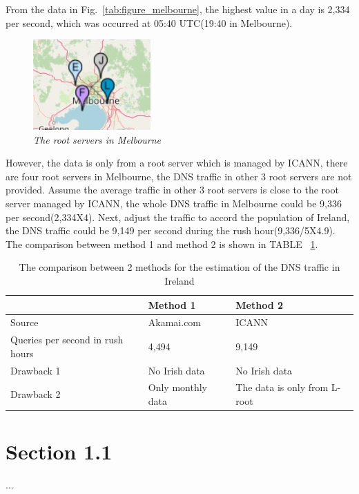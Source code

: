 From the data in Fig.~\ref{tab:figure_melbourne}, the highest value in a day is 2,334 per second, which was occurred at 05:40 UTC(19:40 in Melbourne).
\\

\begin{figure}[hbt!]  
    \centering
    \includegraphics[width=0.4\textwidth]{figure/root-server-map-melbourne.jpg}
    \caption{\em The root servers in Melbourne \cite{root_servers_org} \label{fig:root_servers_Melbourne}}
\end{figure}

However, the data is only from a root server which is managed by ICANN, there are four root servers in Melbourne, the DNS traffic in other 3 root servers are not provided. Assume the average traffic in other 3 root servers is close to the root server managed by ICANN, the whole DNS traffic in Melbourne could be 9,336 per second(2,334X4). Next, adjust the traffic to accord the population of Ireland, the DNS traffic could be 9,149 per second during the rush hour(9,336/5X4.9).
\\

The comparison between method 1 and method 2 is shown in TABLE ~\ref{tab:estimation_comparison}.
\\


\begin{table}[hbt!]
    \centering
    \begin{tabular}{|p{2cm}|p{2.5cm}|p{2.5cm}|}
        \hline
          & Method 1 & Method 2\\    
        \hline
        Source & Akamai.com & ICANN \\
        \hline
         Queries per second in rush hours & 4,494 & 9,149\\
        \hline
         Drawback 1 & No Irish data & No Irish data \\
        \hline
         Drawback 2 & Only monthly data & The data is only from L-root\\
        \hline
    \end{tabular}
    \caption{The comparison between 2 methods for the estimation of the DNS traffic in Ireland}
    \label{tab:estimation_comparison}
\end{table}

	\section{Section 1.1}

	...
